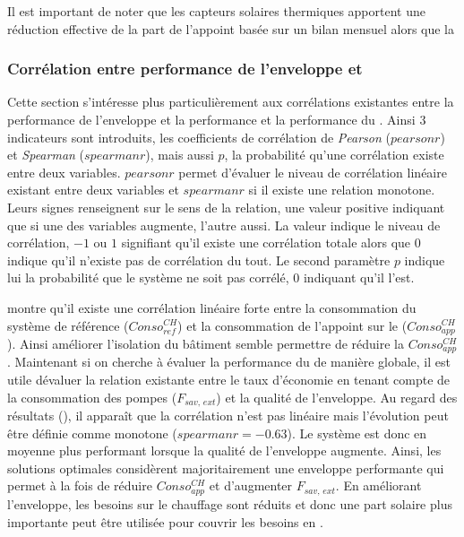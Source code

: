 Il est important de noter que les capteurs solaires thermiques
apportent une réduction
effective de la part de l’appoint basée sur un bilan mensuel alors que la



\subsubsection{Corrélation entre performance de l’enveloppe et } %
\label{ssub:correlation_entre_performance_de_l_enveloppe_et_ssc}
Cette section s’intéresse plus particulièrement aux corrélations existantes entre la
performance de l’enveloppe et la performance et la performance du . Ainsi $3$
indicateurs sont introduits, les coefficients de corrélation de \textit{Pearson}
($pearsonr$) et \textit{Spearman} ($spearmanr$), mais aussi $p$, la probabilité qu’une
corrélation existe entre deux variables. $pearsonr$ permet d’évaluer le niveau de
corrélation linéaire existant entre deux variables et $spearmanr$ si il existe une
relation monotone. Leurs signes renseignent sur le sens de la relation, une valeur
positive indiquant que si une des variables augmente, l’autre aussi. La valeur indique le
niveau de corrélation, $-1$ ou $1$ signifiant qu’il existe une corrélation totale alors
que $0$ indique qu’il n’existe pas de corrélation du tout. Le second paramètre $p$ indique
lui la probabilité que le système ne soit pas corrélé, $0$ indiquant qu’il l’est.

 montre qu’il existe une corrélation linéaire forte entre la
consommation du système de référence ($Conso_{ref}^{CH}$) et la consommation de l’appoint sur
le  ($Conso_{app}^{CH}$). Ainsi améliorer l’isolation du bâtiment semble permettre
de réduire la $Conso_{app}^{CH}$. Maintenant si on cherche à évaluer la performance du
 de manière globale, il est utile dévaluer la relation existante entre
le taux d’économie en tenant compte de la consommation des pompes ($F_{sav,\,ext}$)
et la qualité de l’enveloppe. Au regard des résultats (),
il apparaît que la corrélation n’est pas linéaire mais l’évolution peut être définie
comme monotone ($spearmanr = \num{-0.63}$). Le système est donc en moyenne plus performant
lorsque la qualité de l’enveloppe augmente. Ainsi, les solutions optimales
considèrent majoritairement une enveloppe performante qui permet à la fois de réduire
$Conso_{app}^{CH}$ et d’augmenter $F_{sav,\,ext}$. En améliorant l’enveloppe, les besoins
sur le chauffage sont réduits et donc une part solaire plus importante peut être
utilisée pour couvrir les besoins en .

